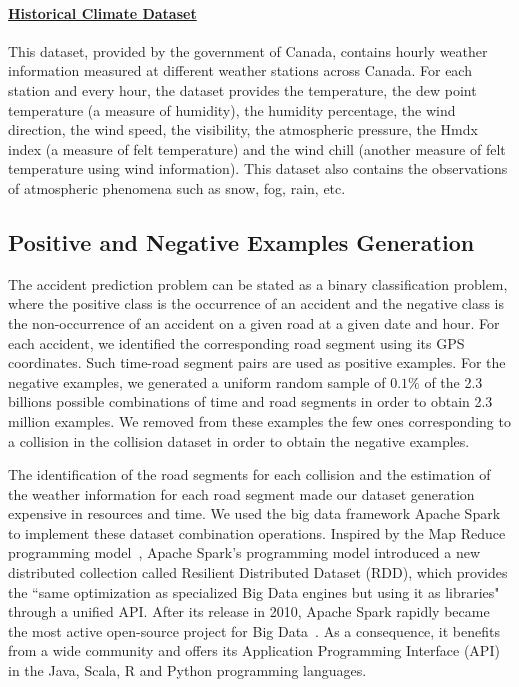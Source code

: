 \documentclass[conference]{IEEEtran}
\begin{document}
\paragraph{\href{http://climate.weather.gc.ca/}{Historical Climate Dataset}\cite{HCD}}

This dataset, provided by the government of Canada, contains hourly weather
information measured at different weather stations across Canada. For each
station and every hour, the dataset provides the temperature, the dew point
temperature (a measure of humidity), the humidity percentage,
the wind direction, the wind speed, the visibility, the atmospheric pressure,
the Hmdx index (a measure of felt temperature) and the wind chill 
 (another measure of felt temperature using wind information).
This dataset also contains the observations of atmospheric phenomena such
as snow, fog, rain, etc.

\subsection{Positive and Negative Examples Generation}

The accident prediction problem can be stated as a binary classification
problem, where the positive class is the occurrence of an accident and the
negative class is the non-occurrence of an accident on a given road at a
given date and hour. For each accident, we identified the
corresponding road segment using its GPS coordinates. Such time-road segment pairs are used as
positive examples. For the negative examples, we generated a uniform random sample
of $0.1\%$ of the 2.3 billions possible combinations of time and road segments
in order to obtain 2.3 million examples. We removed from these examples the few
ones corresponding to a collision in the collision dataset in order to obtain
the negative examples.

The identification of the road segments for each collision and the estimation of the weather
information for each road segment made our dataset generation expensive in resources and time. 
We used the big data framework Apache Spark \cite{Zaharia2016} to implement
these dataset combination operations. 
Inspired by the Map Reduce programming model~\cite{mapreduce}, Apache Spark's programming model introduced a new
distributed collection called Resilient Distributed Dataset (RDD), which
provides the ``same optimization as specialized Big Data engines but using it
as libraries" through a unified API. After its release in 2010, Apache Spark
rapidly became the most active open-source project for Big Data~\cite{spark}.
As a consequence, it benefits from a wide community and offers its Application
Programming Interface (API) in the Java, Scala, R and Python programming languages. 
\end{document}
